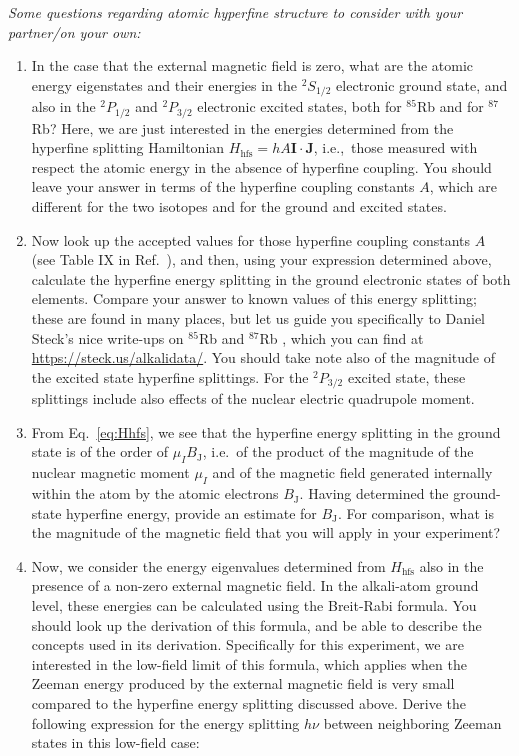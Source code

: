 \documentclass{../lab}
\begin{document}
\emph{Some questions regarding atomic hyperfine structure to consider with your partner/on your own:}
\begin{enumerate}[series=forstudents,label=Q\arabic*.]%
    \item In the case that the external magnetic field is zero, what are the atomic energy eigenstates and their energies in the $^2S_{1/2}$ electronic ground state, and also in the $^2P_{1/2}$ and $^2P_{3/2}$ electronic excited states, both for $^{85}$Rb and for $^{87}$Rb? Here, we are just interested in the energies determined from the hyperfine splitting Hamiltonian $H_\mathrm{hfs} = h A \mathbf{I} \cdot \mathbf{J}$, i.e.,\ those measured with respect the atomic energy in the absence of hyperfine coupling.  You should leave your answer in terms of the hyperfine coupling constants $A$, which are different for the two isotopes and for the ground and excited states.
    \item Now look up the accepted values for those hyperfine coupling constants $A$ (see Table IX in Ref.\ \cite{arim77}), and then, using your expression determined above, calculate the hyperfine energy splitting in the ground electronic states of both elements.  Compare your answer to known values of this energy splitting; these are found in many places, but let us guide you specifically to Daniel Steck's nice write-ups on $^{85}$Rb \cite{steckrb85} and $^{87}$Rb \cite{steckrb87}, which you can find at \url{https://steck.us/alkalidata/}.  You should take note also of the magnitude of the excited state hyperfine splittings.  For the $^2P_{3/2}$ excited state, these splittings include also effects of the nuclear electric quadrupole moment.
    \item{} From Eq.\ \ref{eq:Hhfs}, we see that the hyperfine energy splitting in the ground state is of the order of $\mu_I B_\mathrm{J}$, i.e.\ of the product of the magnitude of the nuclear magnetic moment $\mu_I$ and of the magnetic field generated internally within the atom by the atomic electrons $B_\mathrm{J}$.  Having determined the ground-state hyperfine energy, provide an estimate for $B_\mathrm{J}$.  For comparison, what is the magnitude of the magnetic field that you will apply in your experiment?
    \item{} Now, we consider the energy eigenvalues determined from $H_\mathrm{hfs}$ also in the presence of a non-zero external magnetic field.  In the alkali-atom ground level, these energies can be calculated using the Breit-Rabi formula.  You should look up the derivation of this formula, and be able to describe the concepts used in its derivation.  Specifically for this experiment, we are interested in the low-field limit of this formula, which applies when the Zeeman energy produced by the external magnetic field is very small compared to the hyperfine energy splitting discussed above.  Derive the following expression for the energy splitting $h \nu$ between neighboring Zeeman states in this low-field case:

\end{enumerate}
\end{document}

